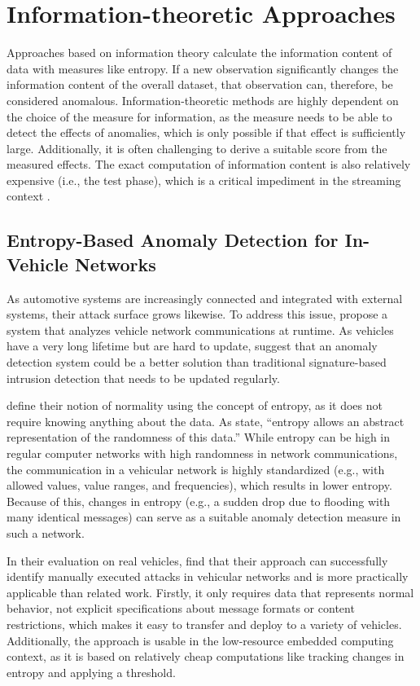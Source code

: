 \section{Information-theoretic Approaches}
Approaches based on information theory calculate the information content of data with measures like entropy. If a new observation significantly changes the information content of the overall dataset, that observation can, therefore, be considered anomalous. Information-theoretic methods are highly dependent on the choice of the measure for information, as the measure needs to be able to detect the effects of anomalies, which is only possible if that effect is sufficiently large. Additionally, it is often challenging to derive a suitable score from the measured effects. The exact computation of information content is also relatively expensive (i.e., the test phase), which is a critical impediment in the streaming context \citep{pimentel_review_2014, kanarachos_detecting_2017}.


\subsection{Entropy-Based Anomaly Detection for In-Vehicle Networks \citep{muter_entropy-based_2011}}
As automotive systems are increasingly connected and integrated with external systems, their attack surface grows likewise. To address this issue, \citet{muter_entropy-based_2011} propose a system that analyzes vehicle network communications at runtime. As vehicles have a very long lifetime but are hard to update, \citet{muter_entropy-based_2011} suggest that an anomaly detection system could be a better solution than traditional signature-based intrusion detection that needs to be updated regularly.

\citet{muter_entropy-based_2011} define their notion of normality using the concept of entropy, as it does not require knowing anything about the data. As \citet{muter_entropy-based_2011} state, ``entropy allows an abstract representation of the randomness of this data.'' While entropy can be high in regular computer networks with high randomness in network communications, the communication in a vehicular network is highly standardized (e.g., with allowed values, value ranges, and frequencies), which results in lower entropy. Because of this, changes in entropy (e.g., a sudden drop due to flooding with many identical messages) can serve as a suitable anomaly detection measure in such a network.

In their evaluation on real vehicles, \citet{muter_entropy-based_2011} find that their approach can successfully identify manually executed attacks in vehicular networks and is more practically applicable than related work. Firstly, it only requires data that represents normal behavior, not explicit specifications about message formats or content restrictions, which makes it easy to transfer and deploy to a variety of vehicles. Additionally, the approach is usable in the low-resource embedded computing context, as it is based on relatively cheap computations like tracking changes in entropy and applying a threshold.


